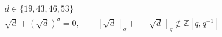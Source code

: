 \documentclass{article}
\begin{document}
\[
\begin{aligned}
&d\in\{19,43,46,53\}\\
&\sqrt d+(\sqrt d)^{\sigma}=0,\qquad [\sqrt d\,]_q+[-\sqrt d\,]_q\notin\mathbb{Z}[q,q^{-1}]
\end{aligned}
\]
\end{document}
